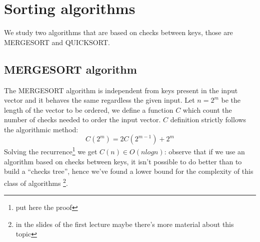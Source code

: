 \section{Sorting algorithms}

We study two algorithms that are based on checks between keys, those
are MERGESORT and QUICKSORT.

\subsection{MERGESORT algorithm}

The MERGESORT algorithm is independent from keys present in the
input vector and it behaves the same regardless the given input.
Let $n = 2^m$ be the length of the vector to be ordered, we define a
function $C$ which count the number of checks needed to order the
input vector. $C$ definition strictly follows the algorithmic method:
\begin{displaymath}
  C(2^m) = 2C(2^{m-1}) + 2^m
\end{displaymath}
Solving the recurrence\footnote{put here the proof} we get $C(n)
\in O(n logn)$: observe that if we use an algorithm based on checks
between keys, it isn't possible to do better than to build a ``checks tree'',
hence we've found
a lower bound for the complexity of this class of algorithms \footnote{in
  the slides of the first lecture maybe there's more material about
  this topic}.

